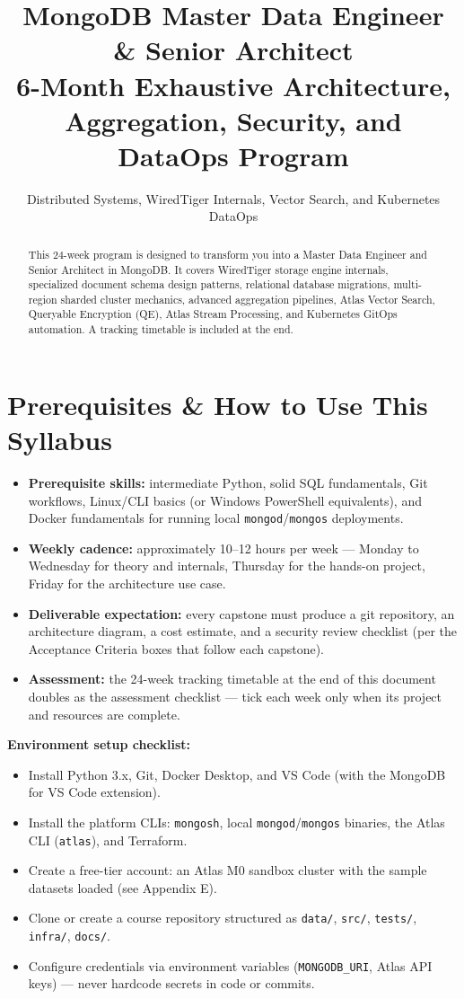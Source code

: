 \documentclass[11pt, a4paper]{article}
\title{\Huge \textbf{MongoDB Master Data Engineer \& Senior Architect}\\ \Large 6-Month Exhaustive Architecture, Aggregation, Security, and DataOps Program}
\author{Distributed Systems, WiredTiger Internals, Vector Search, and Kubernetes DataOps}
\date{}
\begin{document}
\maketitle

\begin{abstract}
\noindent This 24-week program is designed to transform you into a Master Data Engineer and Senior Architect in MongoDB. It covers WiredTiger storage engine internals, specialized document schema design patterns, relational database migrations, multi-region sharded cluster mechanics, advanced aggregation pipelines, Atlas Vector Search, Queryable Encryption (QE), Atlas Stream Processing, and Kubernetes GitOps automation. A tracking timetable is included at the end.
\end{abstract}

\tableofcontents
\newpage

\section*{Prerequisites \& How to Use This Syllabus}
\begin{itemize}[label=-]
    \item \textbf{Prerequisite skills:} intermediate Python, solid SQL fundamentals, Git workflows, Linux/CLI basics (or Windows PowerShell equivalents), and Docker fundamentals for running local \texttt{mongod}/\texttt{mongos} deployments.
    \item \textbf{Weekly cadence:} approximately 10--12 hours per week --- Monday to Wednesday for theory and internals, Thursday for the hands-on project, Friday for the architecture use case.
    \item \textbf{Deliverable expectation:} every capstone must produce a git repository, an architecture diagram, a cost estimate, and a security review checklist (per the Acceptance Criteria boxes that follow each capstone).
    \item \textbf{Assessment:} the 24-week tracking timetable at the end of this document doubles as the assessment checklist --- tick each week only when its project and resources are complete.
\end{itemize}

\textbf{Environment setup checklist:}
\begin{itemize}[label=-]
    \item Install Python 3.x, Git, Docker Desktop, and VS Code (with the MongoDB for VS Code extension).
    \item Install the platform CLIs: \texttt{mongosh}, local \texttt{mongod}/\texttt{mongos} binaries, the Atlas CLI (\texttt{atlas}), and Terraform.
    \item Create a free-tier account: an Atlas M0 sandbox cluster with the sample datasets loaded (see Appendix E).
    \item Clone or create a course repository structured as \texttt{data/}, \texttt{src/}, \texttt{tests/}, \texttt{infra/}, \texttt{docs/}.
    \item Configure credentials via environment variables (\texttt{MONGODB\_URI}, Atlas API keys) --- never hardcode secrets in code or commits.
\end{itemize}
\end{document}
